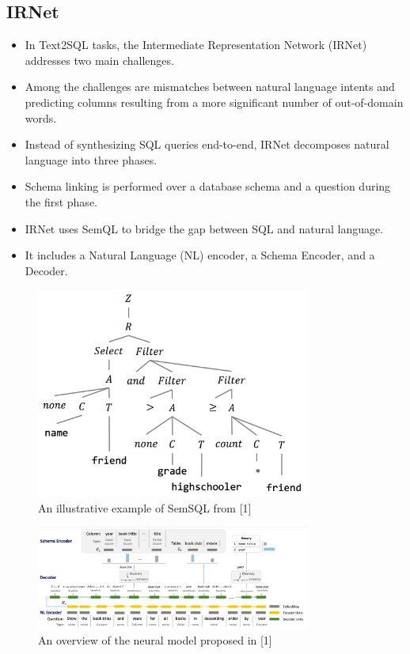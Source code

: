 
\subsection*{IRNet}

\begin{itemize}
    \item In Text2SQL tasks, the Intermediate Representation Network (IRNet) addresses two main challenges.
    \item Among the challenges are mismatches between natural language intents and predicting columns resulting from a more significant number of out-of-domain words.
    \item Instead of synthesizing SQL queries end-to-end, IRNet decomposes natural language into three phases.
    \item Schema linking is performed over a database schema and a question during the first phase.
    \item IRNet uses SemQL to bridge the gap between SQL and natural language.
    \item It includes a Natural Language (NL) encoder, a Schema Encoder, and a Decoder.
\end{itemize}

\begin{figure}[htb]
    \centering
    \includegraphics[width=0.8\textwidth]{pics/IRNet/illustrative_SemSQL}
    \caption{An illustrative example of SemSQL from [1]}
    \label{fig:illustrative_SemSQL}
\end{figure}

\begin{figure}[htb]
    \centering
    \includegraphics[width=0.8\textwidth]{pics/IRNet/overview}
    \caption{An overview of the neural model proposed in [1]}
    \label{fig:overview}
\end{figure}

